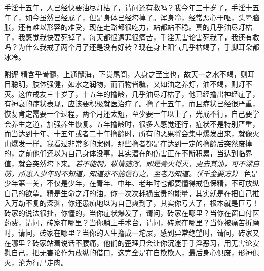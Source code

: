 \begin{case}
    手淫十五年，人已经快要油尽灯枯了，请问还有救吗？我今年三十岁了，手淫十五年了，如今虽然已经戒了，但是身体已经垮掉了。浑身冷，经常恶心干呕，头晕脑胀，还有难以形容的难受，现在走路都很吃力，站都站不稳。真的几乎油尽灯枯了，我感觉我快要死掉了，每天都很遭罪很痛苦，手淫无害论害死我了，我还有救吗？为什么我戒了两个月了还是没有好转？现在身上阳气几乎枯竭了，手脚耳朵都冰冷。

    \textbf{附评} 精含乎骨髓，上通髓海，下贯尾闾，人身之至宝也，故天一之水不竭，则耳目聪明，肢体强健，如水之润物，而百物皆毓，又如油之养灯，油不竭，则灯不灭。这位戒友三十岁了，十五年的撸龄，几乎油尽灯枯了，他已经撸出神经症了，有神衰的症状表现，应该要积极就医治疗了。撸了十五年，而且症状已经很严重，恢复肯定需要一个过程，两个月还太短，至少要一年以上了，光戒不行，自己要学会养生之道，加强养生恢复。五年撸龄时，很多人感觉还行，症状不是特别严重，而当达到十年、十五年或者二十年撸龄时，所有的恶果将会集中爆发出来，就像火山爆发一样。我看过非常多的案例，那些撸者都是在达到一定的撸龄后突然废掉的，之前他们还以为自己身体没事，其实潜在的伤害正在不断积累，当达到临界值，就会突然垮下来。\textit{若不能制，纵情施泻，即是膏火将灭，更去其油，可不深自防，所患人少年时不知道，知道亦不能信行之，至老乃知道。（《千金要方》）} 色是少年第一关，不仅是少年，在青年、中年、老年时也都要懂得戒色保精，不可放纵自己的欲望。精是生命之灯的油，你一次次耗损宝贵的能量，其实就是在把自己推入万劫不复的深渊，你还愚痴地以为自己爽到了，其实你亏大了，根本就是巨亏！砖家的说法很扯，你懂的，当你症状爆发了，请问，砖家在哪里？当你在窗口付医药费，请问，砖家在哪里？当你躺上手术台，请问，砖家在哪里？当你被痛苦折磨时，请问，砖家在哪里？当你的人生撸成一坨屎，感到异常绝望时，请问，砖家又在哪里？砖家站着说话不腰痛，他们的歪理只会让你沉迷于手淫恶习，用无害论安慰自己，把无害论作为放纵的借口，这完全是在自欺欺人，最后身心俱废，形神俱灭，沦为行尸走肉。
\end{case}

